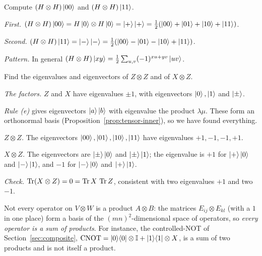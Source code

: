 \begin{example}\label{ex:kron-act}
  Compute $(H\otimes H)\left|00\right\rangle$ and $(H\otimes H)\left|11\right\rangle$.
\end{example}
\begin{solution}
  \begin{steps}
    \item \emph{First.} $(H\otimes H)\left|00\right\rangle=H\left|0\right\rangle\otimes H\left|0\right\rangle=\left|+\right\rangle\left|+\right\rangle=\tfrac12(\left|00\right\rangle+\left|01\right\rangle+\left|10\right\rangle+\left|11\right\rangle)$.
    \item \emph{Second.} $(H\otimes H)\left|11\right\rangle=\left|-\right\rangle\left|-\right\rangle=\tfrac12(\left|00\right\rangle-\left|01\right\rangle-\left|10\right\rangle+\left|11\right\rangle)$.
    \item \emph{Pattern.} In general $(H\otimes H)\left|xy\right\rangle=\tfrac12\sum_{u,v}(-1)^{xu+yv}\left|uv\right\rangle$.
  \end{steps}
\end{solution}

\begin{example}\label{ex:kron-eig}
  Find the eigenvalues and eigenvectors of $Z\otimes Z$ and of $X\otimes Z$.
\end{example}
\begin{solution}
  \begin{steps}
    \item \emph{The factors.} $Z$ and $X$ have eigenvalues $\pm1$, with eigenvectors $\left|0\right\rangle,\left|1\right\rangle$ and $\left|\pm\right\rangle$.
    \item \emph{Rule (e)} gives eigenvectors $\left|a\right\rangle\left|b\right\rangle$ with eigenvalue the product $\lambda\mu$. These form an orthonormal basis (Proposition~\ref{prop:tensor-inner}), so we have found everything.
    \item \emph{$Z\otimes Z$.} The eigenvectors $\left|00\right\rangle,\left|01\right\rangle,\left|10\right\rangle,\left|11\right\rangle$ have eigenvalues $+1,-1,-1,+1$.
    \item \emph{$X\otimes Z$.} The eigenvectors are $\left|\pm\right\rangle\left|0\right\rangle$ and $\left|\pm\right\rangle\left|1\right\rangle$; the eigenvalue is $+1$ for $\left|+\right\rangle\left|0\right\rangle$ and $\left|-\right\rangle\left|1\right\rangle$, and $-1$ for $\left|-\right\rangle\left|0\right\rangle$ and $\left|+\right\rangle\left|1\right\rangle$.
    \item \emph{Check.} $\operatorname{Tr}(X\otimes Z)=0=\operatorname{Tr} X\,\operatorname{Tr} Z$, consistent with two eigenvalues $+1$ and two $-1$.
  \end{steps}
\end{solution}

Not every operator on $V\otimes W$ is a product $A\otimes B$: the matrices $E_{ij}\otimes E_{kl}$ (with a $1$ in one place) form a basis of the $(mn)^2$-dimensional space of operators, so \emph{every operator is a sum of products}. For instance, the controlled-NOT of Section~\ref{sec:composite}, $\mathrm{CNOT}=\left|0\right\rangle\!\left\langle0\right|\otimes\mathbb{I}+\left|1\right\rangle\!\left\langle1\right|\otimes X$, is a sum of two products and is not itself a product.

